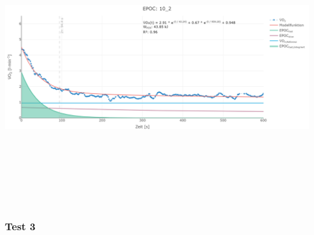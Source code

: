 \documentclass[
  letterpaper,
  DIV=11]{scrartcl}
\begin{document}
\includegraphics[width=11.45833in,height=4.6875in]{images/10_2.png}

\subsubsection{Test 3}
\end{document}
